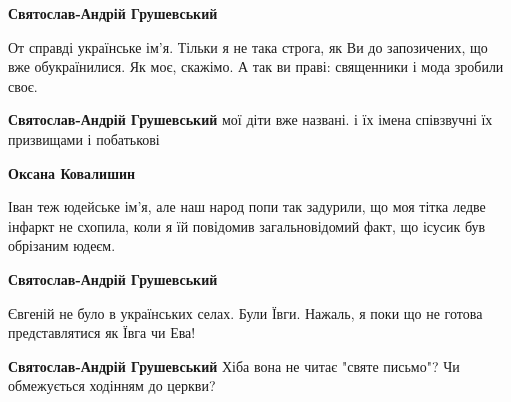 \begin{itemize}
\begin{itemize}
\textbf{Святослав-Андрій Грушевський} 

От справді українське ім'я. Тільки я не така строга, як Ви до запозичених, що
вже обукраїнилися. Як моє, скажімо. А так ви праві: священники і мода зробили
своє.


 
\textbf{Святослав-Андрій Грушевський} мої діти вже названі. і їх імена співзвучні їх призвищами і побатькові

 
\textbf{Оксана Ковалишин} 

Іван теж юдейське ім'я, але наш народ попи так задурили, що моя тітка ледве
інфаркт не схопила, коли я їй повідомив загальновідомий факт, що ісусик був
обрізаним юдеєм.🤣🤣🤣


 
\textbf{Святослав-Андрій Грушевський} 

Євгеній не було в українських селах. Були
Ївги. Нажаль, я поки що не готова представлятися як Ївга чи Ева!


 
\textbf{Святослав-Андрій Грушевський} Хіба вона не читає "святе письмо"? Чи обмежується ходінням до церкви? \Smiley[1.0][yellow]

 

\end{itemize}
\end{itemize}
